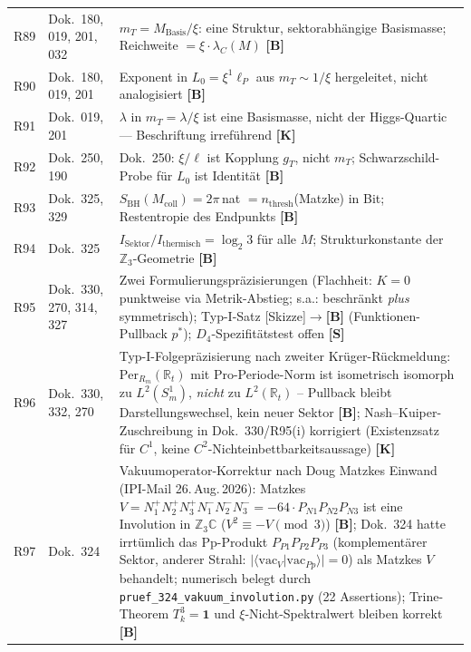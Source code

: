 \begin{longtable}{@{}p{0.9cm}p{3.1cm}p{10.2cm}@{}}
R89 & Dok.~180, 019, 201, 032 & $m_T = M_\mathrm{Basis}/\xi$: eine Struktur, sektorabh\"angige Basismasse; Reichweite $=\xi\cdot\lambda_C(M)$ \textbf{[B]} \\
R90 & Dok.~180, 019, 201 & Exponent in $L_0 = \xi^1\ell_P$ aus $m_T\sim1/\xi$ hergeleitet, nicht analogisiert \textbf{[B]} \\
R91 & Dok.~019, 201 & $\lambda$ in $m_T=\lambda/\xi$ ist eine Basismasse, nicht der Higgs-Quartic --- Beschriftung irref\"uhrend \textbf{[K]} \\
R92 & Dok.~250, 190 & Dok.~250: $\xi/\ell$ ist Kopplung $g_T$, nicht $m_T$; Schwarzschild-Probe f\"ur $L_0$ ist Identit\"at \textbf{[B]} \\
R93 & Dok.~325, 329 & $S_\mathrm{BH}(M_\mathrm{coll}) = 2\pi$\,nat $= n_\mathrm{thresh}$(Matzke) in Bit; Restentropie des Endpunkts \textbf{[B]} \\
R94 & Dok.~325 & $I_\mathrm{Sektor}/I_\mathrm{thermisch} = \log_2 3$ für alle $M$; Strukturkonstante der $\mathbb{Z}_3$-Geometrie \textbf{[B]} \\
R95 & Dok.~330, 270, 314, 327 & Zwei Formulierungspräzisierungen (Flachheit: $K{=}0$ punktweise via Metrik-Abstieg; s.a.: beschränkt \emph{plus} symmetrisch); Typ-I-Satz [Skizze]$\to$\textbf{[B]} (Funktionen-Pullback $p^*$); $D_4$-Spezifitätstest offen \textbf{[S]} \\
R96 & Dok.~330, 332, 270 & Typ-I-Folgepräzisierung nach zweiter Krüger-Rückmeldung: $\mathrm{Per}_{R_m}(\mathbb{R}_t)$ mit Pro-Periode-Norm ist isometrisch isomorph zu $L^2(S^1_m)$, \emph{nicht} zu $L^2(\mathbb{R}_t)$ -- Pullback bleibt Darstellungswechsel, kein neuer Sektor \textbf{[B]}; Nash--Kuiper-Zuschreibung in Dok.~330/R95(i) korrigiert (Existenzsatz für $C^1$, keine $C^2$-Nichteinbettbarkeitsaussage) \textbf{[K]} \\
R97 & Dok.~324 & Vakuumoperator-Korrektur nach Doug Matzkes Einwand (IPI-Mail 26.\,Aug.\,2026): Matzkes $V = N_1^+N_2^+N_3^+N_1^-N_2^-N_3^- = -64\cdot P_{N1}P_{N2}P_{N3}$ ist eine Involution in $\mathbb{Z}_3\mathbb{C}$ ($V^2 \equiv -V \pmod{3}$) \textbf{[B]}; Dok.~324 hatte irrtümlich das Pp-Produkt $P_{P1}P_{P2}P_{P3}$ (komplementärer Sektor, anderer Strahl: $|\langle\mathrm{vac}_V|\mathrm{vac}_{Pp}\rangle|=0$) als Matzkes $V$ behandelt; numerisch belegt durch \texttt{pruef\_324\_vakuum\_involution.py} (22 Assertions); Trine-Theorem $T_k^3=\mathbf{1}$ und $\xi$-Nicht-Spektralwert bleiben korrekt \textbf{[B]} \\

\end{longtable}

